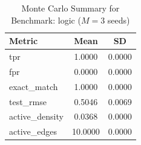 \begin{table}[ht]
\centering
\caption{Monte Carlo Summary for Benchmark: logic ($M = 3$ seeds)}
\begin{tabular}{lcc}
\hline
Metric & Mean & SD \\
\hline
tpr & 1.0000 & 0.0000 \\
fpr & 0.0000 & 0.0000 \\
exact\_match & 1.0000 & 0.0000 \\
test\_rmse & 0.5046 & 0.0069 \\
active\_density & 0.0368 & 0.0000 \\
active\_edges & 10.0000 & 0.0000 \\
\hline
\end{tabular}
\end{table}
